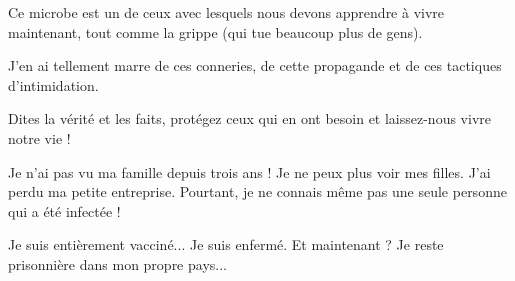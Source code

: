 {Ce microbe est un de ceux avec lesquels nous devons apprendre à vivre maintenant, tout comme la grippe (qui tue beaucoup plus de gens).

J'en ai tellement marre de ces conneries, de cette propagande et de ces tactiques d'intimidation.

Dites la vérité et les faits, protégez ceux qui en ont besoin et laissez-nous vivre notre vie !

Je n'ai pas vu ma famille depuis trois ans ! Je ne peux plus voir mes
filles. J'ai perdu ma petite entreprise. Pourtant, je ne connais même pas une
seule personne qui a été infectée !

Je suis entièrement vacciné... Je suis enfermé. Et maintenant ? Je reste
prisonnière dans mon propre pays...

}
